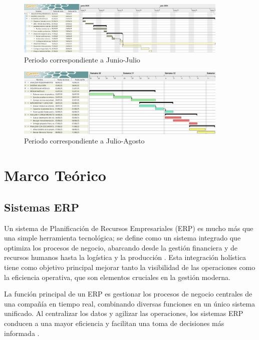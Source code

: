 \documentclass[12pt,letterpaper,spanish]{report}
\begin{document}
\begin{figure}[htp]
  \centering
  \includegraphics[width=0.9\textwidth]{Gantt_Week_23_30.jpg}
  \caption{Periodo correspondiente a Junio-Julio}\label{a04}
\end{figure}

\begin{figure}[htp]
  \centering
  \includegraphics[width=0.9\textwidth]{Gantt_Week_30_32.jpg}
  \caption{Periodo correspondiente a Julio-Agosto}\label{a05}
\end{figure}

\chapter{Marco Teórico}
\newpage

\section{Sistemas ERP}
Un sistema de Planificación de Recursos Empresariales (ERP) es mucho más que una simple herramienta tecnológica; se define como un sistema integrado que optimiza los procesos de negocio, abarcando desde la gestión financiera y de recursos humanos hasta la logística y la producción \citep{Hammouch_2024}. Esta integración holística tiene como objetivo principal mejorar tanto la visibilidad de las operaciones como la eficiencia operativa, que son elementos cruciales en la gestión moderna.

La función principal de un ERP es gestionar los procesos de negocio centrales de una compañía en tiempo real, combinando diversas funciones en un único sistema unificado. Al centralizar los datos y agilizar las operaciones, los sistemas ERP conducen a una mayor eficiencia y facilitan una toma de decisiones más informada \cite{Hammouch_2024}.
\end{document}

